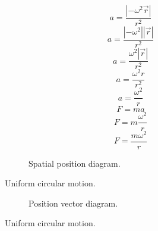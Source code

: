 \documentclass[a4paper,12pt]{report}
\begin{document}
\begin{equation}
a = \frac{|-\omega^2 \vec{r}|}{r^2}
\end{equation}
\begin{equation}
a = \frac{|-\omega^2| |\vec{r}|}{r^2}
\end{equation}
\begin{equation}
a = \frac{\omega^2 |\vec{r}|}{r^2}
\end{equation}
\begin{equation}
a = \frac{\omega^2 r}{r^2}
\end{equation}
\begin{equation}
a = \frac{\omega^2}{r}
\end{equation}
\begin{equation}
F = ma
\end{equation}
\begin{equation}
F = m \frac{\omega^2}{r}
\end{equation}
\begin{equation}
F = \frac{m \omega^2}{r}
\end{equation}
\clearpage
\begin{figure}[p]
\centering
\begin{subfigure}{\textwidth}
\centering
\resizebox{\textwidth}{!}{}
\caption{Spatial position diagram.}
\end{subfigure}
\caption{Uniform circular motion.}
\end{figure}
\clearpage
\begin{figure}[p]
\centering
\ContinuedFloat
\begin{subfigure}{\textwidth}
\centering
\resizebox{\textwidth}{!}{}
\caption{Position vector diagram.}
\end{subfigure}
\caption{Uniform circular motion.}
\end{figure}
\end{document}
